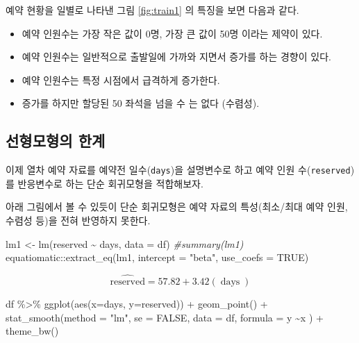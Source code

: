 \documentclass[
  10pt,
]{book}
\newenvironment{Shaded}{\begin{snugshade}}{\end{snugshade}}
\newcommand{\AttributeTok}[1]{\textcolor[rgb]{0.77,0.63,0.00}{#1}}
\newcommand{\CommentTok}[1]{\textcolor[rgb]{0.56,0.35,0.01}{\textit{#1}}}
\newcommand{\ConstantTok}[1]{\textcolor[rgb]{0.00,0.00,0.00}{#1}}
\newcommand{\FunctionTok}[1]{\textcolor[rgb]{0.00,0.00,0.00}{#1}}
\newcommand{\NormalTok}[1]{#1}
\newcommand{\OtherTok}[1]{\textcolor[rgb]{0.56,0.35,0.01}{#1}}
\newcommand{\SpecialCharTok}[1]{\textcolor[rgb]{0.00,0.00,0.00}{#1}}
\newcommand{\StringTok}[1]{\textcolor[rgb]{0.31,0.60,0.02}{#1}}
\providecommand{\tightlist}{%
  \setlength{\itemsep}{0pt}\setlength{\parskip}{0pt}}
\theoremstyle{definition}
\theoremstyle{definition}
\theoremstyle{definition}
\theoremstyle{definition}
\theoremstyle{remark}
\begin{document}
예약 현황을 일별로 나타낸 그림 \ref{fig:train1} 의 특징을 보면 다음과 같다.

\begin{itemize}
\tightlist
\item
  예약 인원수는 가장 작은 값이 0명, 가장 큰 값이 50명 이라는 제약이 있다.
\item
  예약 인원수는 일반적으로 출발일에 가까와 지면서 증가를 하는 경향이 있다.
\item
  예약 인원수는 특정 시점에서 급격하게 증가한다.
\item
  증가를 하지만 할당된 50 좌석을 넘을 수 는 없다 (수렴성).
\end{itemize}

\hypertarget{uxc120uxd615uxbaa8uxd615uxc758-uxd55cuxacc4}{%
\subsection{선형모형의 한계}\label{uxc120uxd615uxbaa8uxd615uxc758-uxd55cuxacc4}}

이제 열차 예약 자료를 예약전 일수(\texttt{days})을 설명변수로 하고 예약 인원 수(\texttt{reserved})를 반응변수로 하는 단순 회귀모형을 적합해보자.

아래 그림에서 볼 수 있듯이 단순 회귀모형은 예약 자료의 특성(최소/최대 예약 인원, 수렴성 등)을 전혀 반영하지 못한다.

\begin{Shaded}
\begin{Highlighting}[]
\NormalTok{lm1 }\OtherTok{\textless{}{-}} \FunctionTok{lm}\NormalTok{(reserved }\SpecialCharTok{\textasciitilde{}}\NormalTok{ days, }\AttributeTok{data =}\NormalTok{ df)}
\CommentTok{\#summary(lm1)}
\NormalTok{equatiomatic}\SpecialCharTok{::}\FunctionTok{extract\_eq}\NormalTok{(lm1, }\AttributeTok{intercept =} \StringTok{"beta"}\NormalTok{,  }\AttributeTok{use\_coefs =} \ConstantTok{TRUE}\NormalTok{)}
\end{Highlighting}
\end{Shaded}

\[
\operatorname{\widehat{reserved}} = 57.82 + 3.42(\operatorname{days})
\]

\begin{Shaded}
\begin{Highlighting}[]
\NormalTok{df }\SpecialCharTok{\%\textgreater{}\%} \FunctionTok{ggplot}\NormalTok{(}\FunctionTok{aes}\NormalTok{(}\AttributeTok{x=}\NormalTok{days, }\AttributeTok{y=}\NormalTok{reserved)) }\SpecialCharTok{+} 
  \FunctionTok{geom\_point}\NormalTok{() }\SpecialCharTok{+} 
  \FunctionTok{stat\_smooth}\NormalTok{(}\AttributeTok{method =} \StringTok{"lm"}\NormalTok{, }\AttributeTok{se =} \ConstantTok{FALSE}\NormalTok{, }\AttributeTok{data =}\NormalTok{ df,}
              \AttributeTok{formula =}\NormalTok{ y }\SpecialCharTok{\textasciitilde{}}\NormalTok{x ) }\SpecialCharTok{+}
  \FunctionTok{theme\_bw}\NormalTok{()}
\end{Highlighting}
\end{Shaded}
\end{document}
